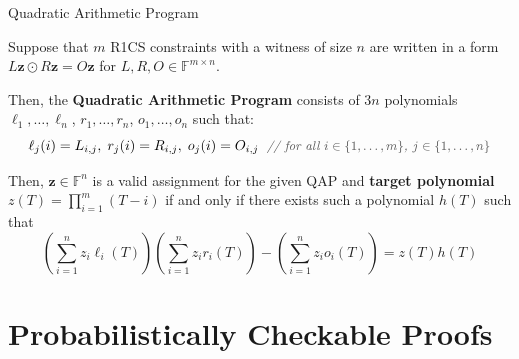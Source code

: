 \documentclass{zkdl-presentation-template}
\begin{document}
    \begin{frame}{Quadratic Arithmetic Program}
        \begin{definition}
            Suppose that $m$ R1CS constraints with a witness of size $n$ are written in a form $L\mathbf{z} \odot R\mathbf{z} = O\mathbf{z}$ for $L,R,O \in \mathbb{F}^{m \times n}$.

            Then, the \textbf{Quadratic Arithmetic Program} consists of $3n$ polynomials $\ell_1,\dots,\ell_n$, $r_1,\dots,r_n$, $o_1,\dots,o_n$ such that:
            \begin{equation*}
                \ell_j(i) = L_{i,j}, \; r_j(i) = R_{i,j}, \; o_j(i) = O_{i,j} \; \commentgray{for all $i \in \{1,\dots,m\}$, $j \in \{1,\dots,n\}$}
            \end{equation*}

            Then, $\mathbf{z} \in \mathbb{F}^n$ is a valid assignment for the given QAP and \textbf{target polynomial} $z(T) = \prod_{i=1}^m (T-i)$ if and only if there exists such a polynomial $h(T)$ such that
            \begin{equation*}
                \left( \sum_{i = 1}^{n} z_i\ell_i(T) \right)\left( \sum_{i = 1}^{n} z_ir_i(T) \right) - \left( \sum_{i = 1}^{n} z_io_i(T) \right) = z(T)h(T)
            \end{equation*}
        \end{definition}
    \end{frame}

    \section{Probabilistically Checkable Proofs}
\end{document}
